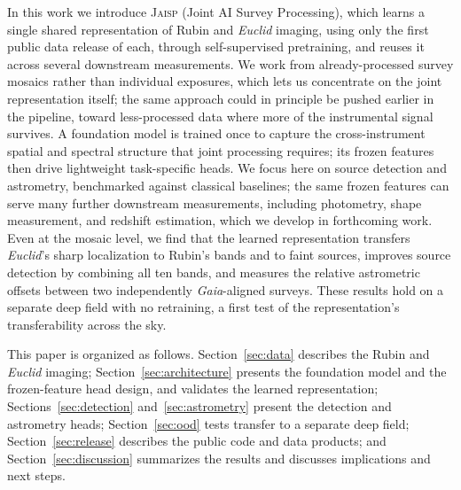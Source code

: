 \documentclass[twocolumn,linenumbers]{aastex701}
\newcommand{\jaisp}{\textsc{Jaisp}}
\begin{document}
In this work we introduce \jaisp{} (Joint AI Survey Processing), which learns a single shared representation of Rubin and \textit{Euclid} imaging, using only the first public data release of each, through self-supervised pretraining, and reuses it across several downstream measurements. We work from already-processed survey mosaics rather than individual exposures, which lets us concentrate on the joint representation itself; the same approach could in principle be pushed earlier in the pipeline, toward less-processed data where more of the instrumental signal survives. A foundation model is trained once to capture the cross-instrument spatial and spectral structure that joint processing requires; its frozen features then drive lightweight task-specific heads. We focus here on source detection and astrometry, benchmarked against classical baselines; the same frozen features can serve many further downstream measurements, including photometry, shape measurement, and redshift estimation, which we develop in forthcoming work. Even at the mosaic level, we find that the learned representation transfers \textit{Euclid}'s sharp localization to Rubin's bands and to faint sources, improves source detection by combining all ten bands, and measures the relative astrometric offsets between two independently \textit{Gaia}-aligned surveys. These results hold on a separate deep field with no retraining, a first test of the representation's transferability across the sky.

This paper is organized as follows. Section~\ref{sec:data} describes the Rubin and \textit{Euclid} imaging; Section~\ref{sec:architecture} presents the foundation model and the frozen-feature head design, and validates the learned representation; Sections~\ref{sec:detection} and~\ref{sec:astrometry} present the detection and astrometry heads; Section~\ref{sec:ood} tests transfer to a separate deep field; Section~\ref{sec:release} describes the public code and data products; and Section~\ref{sec:discussion} summarizes the results and discusses implications and next steps.
\end{document}
